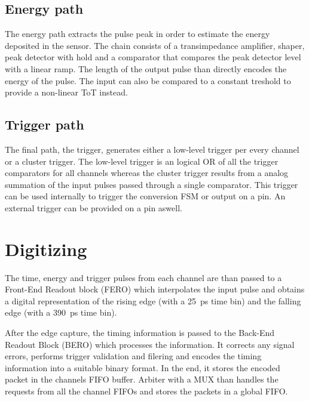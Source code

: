 \subsection{Energy path}
The energy path extracts the pulse peak in order to estimate the energy deposited in the sensor. The chain consists of a transimpedance amplifier, shaper, peak detector with hold and a comparator that compares the peak detector level with a linear ramp. The length of the output pulse than directly encodes the energy of the pulse. The input can also be compared to a constant treshold to provide a non-linear ToT instead. 

\subsection{Trigger path}
The final path, the trigger, generates either a low-level trigger per every channel or a cluster trigger. The low-level trigger is an logical OR of all the trigger comparators for all channels whereas the cluster trigger results from a analog summation of the input pulses passed through a single comparator. This trigger can be used internally to trigger the conversion FSM or output on a pin. An external trigger can be provided on a pin aswell.



\section{Digitizing}
\label{sec:fastic_digitizing}
The time, energy and trigger pulses from each channel are than passed to a Front-End Readout block (FERO) which interpolates the input pulse and obtains a digital representation of the rising edge (with a \SI{25}{\pico\second} time bin) and the falling edge (with a \SI{390}{\pico\second} time bin).

After the edge capture, the timing information is passed to the Back-End Readout Block (BERO) which processes the information. It corrects any signal errors, performs trigger validation and filering and encodes the timing information into a suitable binary format. In the end, it stores the encoded packet in the channels FIFO buffer. Arbiter with a MUX than handles the requests from all the channel FIFOs and stores the packets in a global FIFO. 

